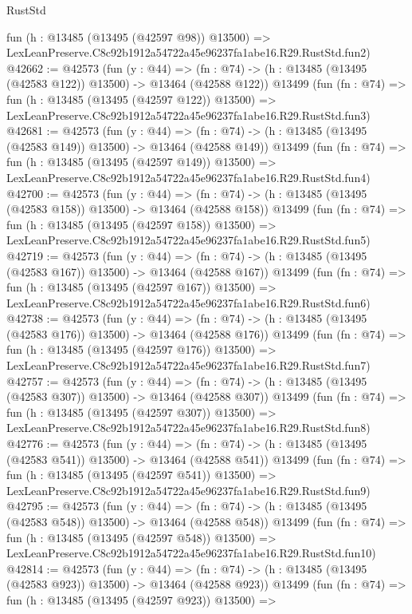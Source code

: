 \begin{lexlean}{RustStd}
\begin{coremodule}
    fun (h : @13485 (@13495 (@42597 @98)) @13500) =>
    LexLeanPreserve.C8c92b1912a54722a45e96237fa1abe16.R29.RustStd.fun2)
@42662 := @42573
    (fun (y : @44) =>
    (fn : @74) -> (h : @13485 (@13495 (@42583 @122)) @13500) -> @13464 (@42588 @122))
    @13499
    (fun (fn : @74) =>
    fun (h : @13485 (@13495 (@42597 @122)) @13500) =>
    LexLeanPreserve.C8c92b1912a54722a45e96237fa1abe16.R29.RustStd.fun3)
@42681 := @42573
    (fun (y : @44) =>
    (fn : @74) -> (h : @13485 (@13495 (@42583 @149)) @13500) -> @13464 (@42588 @149))
    @13499
    (fun (fn : @74) =>
    fun (h : @13485 (@13495 (@42597 @149)) @13500) =>
    LexLeanPreserve.C8c92b1912a54722a45e96237fa1abe16.R29.RustStd.fun4)
@42700 := @42573
    (fun (y : @44) =>
    (fn : @74) -> (h : @13485 (@13495 (@42583 @158)) @13500) -> @13464 (@42588 @158))
    @13499
    (fun (fn : @74) =>
    fun (h : @13485 (@13495 (@42597 @158)) @13500) =>
    LexLeanPreserve.C8c92b1912a54722a45e96237fa1abe16.R29.RustStd.fun5)
@42719 := @42573
    (fun (y : @44) =>
    (fn : @74) -> (h : @13485 (@13495 (@42583 @167)) @13500) -> @13464 (@42588 @167))
    @13499
    (fun (fn : @74) =>
    fun (h : @13485 (@13495 (@42597 @167)) @13500) =>
    LexLeanPreserve.C8c92b1912a54722a45e96237fa1abe16.R29.RustStd.fun6)
@42738 := @42573
    (fun (y : @44) =>
    (fn : @74) -> (h : @13485 (@13495 (@42583 @176)) @13500) -> @13464 (@42588 @176))
    @13499
    (fun (fn : @74) =>
    fun (h : @13485 (@13495 (@42597 @176)) @13500) =>
    LexLeanPreserve.C8c92b1912a54722a45e96237fa1abe16.R29.RustStd.fun7)
@42757 := @42573
    (fun (y : @44) =>
    (fn : @74) -> (h : @13485 (@13495 (@42583 @307)) @13500) -> @13464 (@42588 @307))
    @13499
    (fun (fn : @74) =>
    fun (h : @13485 (@13495 (@42597 @307)) @13500) =>
    LexLeanPreserve.C8c92b1912a54722a45e96237fa1abe16.R29.RustStd.fun8)
@42776 := @42573
    (fun (y : @44) =>
    (fn : @74) -> (h : @13485 (@13495 (@42583 @541)) @13500) -> @13464 (@42588 @541))
    @13499
    (fun (fn : @74) =>
    fun (h : @13485 (@13495 (@42597 @541)) @13500) =>
    LexLeanPreserve.C8c92b1912a54722a45e96237fa1abe16.R29.RustStd.fun9)
@42795 := @42573
    (fun (y : @44) =>
    (fn : @74) -> (h : @13485 (@13495 (@42583 @548)) @13500) -> @13464 (@42588 @548))
    @13499
    (fun (fn : @74) =>
    fun (h : @13485 (@13495 (@42597 @548)) @13500) =>
    LexLeanPreserve.C8c92b1912a54722a45e96237fa1abe16.R29.RustStd.fun10)
@42814 := @42573
    (fun (y : @44) =>
    (fn : @74) -> (h : @13485 (@13495 (@42583 @923)) @13500) -> @13464 (@42588 @923))
    @13499
    (fun (fn : @74) =>
    fun (h : @13485 (@13495 (@42597 @923)) @13500) =>

\end{coremodule}
\end{lexlean}
